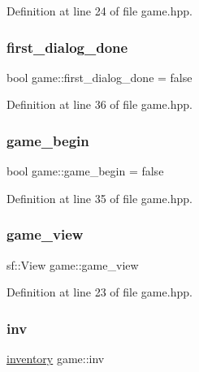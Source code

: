 Definition at line 24 of file game.\+hpp.

\mbox{\label{classgame_ac28a00d246bdb9b92858bd876c6edd0e}} 
\subsubsection{\texorpdfstring{first\+\_\+dialog\+\_\+done}{first\_dialog\_done}}
{\footnotesize\ttfamily bool game\+::first\+\_\+dialog\+\_\+done = false\hspace{0.3cm}{\ttfamily [private]}}



Definition at line 36 of file game.\+hpp.

\mbox{\label{classgame_ae82c66167f3bf9cd4892a9e0ec6c3ba6}} 
\subsubsection{\texorpdfstring{game\+\_\+begin}{game\_begin}}
{\footnotesize\ttfamily bool game\+::game\+\_\+begin = false\hspace{0.3cm}{\ttfamily [private]}}



Definition at line 35 of file game.\+hpp.

\mbox{\label{classgame_ac607d12774a2ebf6fb3cf24a60f47fed}} 
\subsubsection{\texorpdfstring{game\+\_\+view}{game\_view}}
{\footnotesize\ttfamily sf\+::\+View game\+::game\+\_\+view\hspace{0.3cm}{\ttfamily [private]}}



Definition at line 23 of file game.\+hpp.

\mbox{\label{classgame_a4bfc9c9555fc75525ba0d8719827e749}} 
\subsubsection{\texorpdfstring{inv}{inv}}
{\footnotesize\ttfamily \hyperlink{classinventory}{inventory} game\+::inv\hspace{0.3cm}{\ttfamily [private]}}



